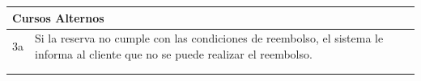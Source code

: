     \begin{table}[H]
        \begin{tabular}{llllllll}
    \hline
    \multicolumn{8}{|l|}{\cellcolor[HTML]{F2F2F2}Cursos Alternos}                                                                                                                                                                                                                                                                                \\ \hline
    \multicolumn{1}{|c|}{3a} & \multicolumn{7}{p{15cm}|}{{\color[HTML]{808080} Si la reserva no cumple con las condiciones de reembolso, el sistema le informa al cliente que no se puede realizar el reembolso.}}                                                                                                                                      \\ \hline
    \multicolumn{1}{c}{}     & \multicolumn{7}{l}{}                                                                                                                                                                                                                                                                                              \\                                                                                                    &                                                                 &                            &                            &                          &                          &                        
    \end{tabular}
    \end{table}

